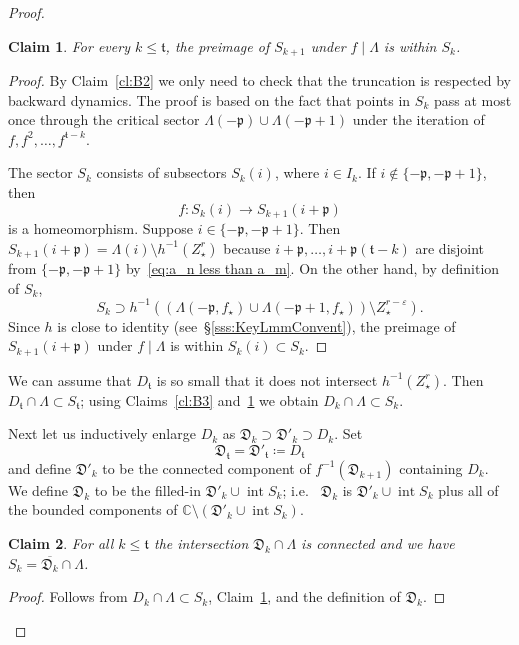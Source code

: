 \documentclass[]{amsart}
\newcommand{\bLambda}{{\mathbb{\Lambda}}}
\newcommand\intr{\operatorname{int}}
\newcommand{\str}{{\star}}
\newcommand{\pp}{\mathfrak{p}}
\renewcommand{\tt}{\mathfrak{t}}
\newtheorem{claim}{Claim}
\newcommand{\C}{\mathbb{C}}
\theoremstyle{remark}
\numberwithin{equation}{section}
\theoremstyle{definition}
\begin{document}
\begin{proof}
\begin{claim}
\label{cl:D1} For every $k\le \tt$, the preimage of $S_{k+1}$ under $f\mid \bLambda$ is within $S_{k}$.
\end{claim}
\begin{proof}
By Claim~\ref{cl:B2} we only need to check that the truncation is respected by backward dynamics. The proof is based on the fact that points in $S_k$ pass at most once through the critical sector $\bLambda(-\pp)\cup \bLambda(-\pp+1)$ under the iteration of $f, f^2,\dots, f^{\tt-k}$. 

The sector $S_k$ consists of subsectors $S_k(i)$, where $i\in I_k$. If $i\not \in \{-\pp,-\pp+1\}$, then \[f\colon S_k(i)\to S_{k+1}(i+\pp)\] is a homeomorphism. Suppose $i\in  \{-\pp,-\pp+1\}$. Then $S_{k+1}(i+\pp)=\Lambda(i)\setminus h^{-1}(Z_\str^{r  })$ because $i+\pp,\dots, i+\pp (\tt-k)$ are disjoint from $\{-\pp,-\pp+1\}$ by~\eqref{eq:a_n less than a_m}. On the other hand, by definition of $S_k$,
 \[S_{k}\supset  h^{-1}\left((\Lambda(-\pp,f_\str)\cup \Lambda(-\pp+1,f_\str))\setminus Z_\str^{r-\varepsilon}\right).\]
Since $h$ is close to identity (see~\S\ref{sss:KeyLmmConvent}), the preimage of $S_{k+1}(i+\pp)$ under $f\mid \bLambda$ is within $S_{k}(i)\subset S_k$.
\end{proof}

We can assume that $D_{\tt}$ is so small that it does not intersect $h^{-1}(Z_\str^{r})$. Then $D_{\tt}\cap \bLambda\subset S_{\tt}$; using Claims~\ref{cl:B3} and~\ref{cl:D1} we obtain $D_k\cap \bLambda \subset S_k$.

Next let us inductively enlarge $D_k$ as $\mathfrak D_{k}\supset \mathfrak D'_{k}\supset D_k$. Set \[\mathfrak D_{\tt}=\mathfrak D'_{\tt}\coloneqq  D_{\tt}\]  and define $\mathfrak D'_{k}$ to be the connected component of $f^{-1}(\mathfrak D_{k+1})$ containing $D_{k}$. We define $\mathfrak D_{k}$ to be the filled-in $\mathfrak D'_{k}\cup  \intr S_{k}$; i.e.~ $\mathfrak D_{k}$ is $\mathfrak D'_{k}\cup  \intr S_{k} $ plus all of the bounded components of $\C\setminus (\mathfrak D'_{k}\cup    \intr S_{k})$. 

\begin{claim}
\label{cl:D2} For all $k\le \tt$ the intersection $\mathfrak D_k\cap\bLambda$ is connected and we have $ {S_k= \overline{ \mathfrak D_k}\cap\bLambda}$.
\end{claim}
\begin{proof}
Follows from $D_k\cap \bLambda \subset S_k$, Claim~\ref{cl:D1}, and the definition of $\mathfrak D_k$.
\end{proof}





\end{proof}
\end{document}
